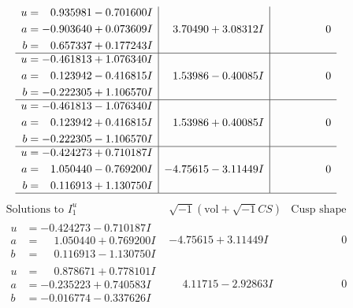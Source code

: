 \documentclass[1p]{elsarticle_modified}
\theoremstyle{definition}
\newcommand{\I}{\sqrt{-1}}
\begin{document}
$$\begin{array}{c|c|c}
\begin{aligned}
u &= \phantom{-}0.935981 - 0.701600 I \\
a &= -0.903640 + 0.073609 I \\
b &= \phantom{-}0.657337 + 0.177243 I\end{aligned}
 & \phantom{-}3.70490 + 3.08312 I & \phantom{-0.000000 } 0 \\ \hline\begin{aligned}
u &= -0.461813 + 1.076340 I \\
a &= \phantom{-}0.123942 - 0.416815 I \\
b &= -0.222305 + 1.106570 I\end{aligned}
 & \phantom{-}1.53986 - 0.40085 I & \phantom{-0.000000 } 0 \\ \hline\begin{aligned}
u &= -0.461813 - 1.076340 I \\
a &= \phantom{-}0.123942 + 0.416815 I \\
b &= -0.222305 - 1.106570 I\end{aligned}
 & \phantom{-}1.53986 + 0.40085 I & \phantom{-0.000000 } 0 \\ \hline\begin{aligned}
u &= -0.424273 + 0.710187 I \\
a &= \phantom{-}1.050440 - 0.769200 I \\
b &= \phantom{-}0.116913 + 1.130750 I\end{aligned}
 & -4.75615 - 3.11449 I & \phantom{-0.000000 } 0\\
 \hline 
 \end{array}$$\newpage$$\begin{array}{c|c|c}  
\text{Solutions to }I^u_{1}& \I (\text{vol} + \sqrt{-1}CS) & \text{Cusp shape}\\
 \hline 
\begin{aligned}
u &= -0.424273 - 0.710187 I \\
a &= \phantom{-}1.050440 + 0.769200 I \\
b &= \phantom{-}0.116913 - 1.130750 I\end{aligned}
 & -4.75615 + 3.11449 I & \phantom{-0.000000 } 0 \\ \hline\begin{aligned}
u &= \phantom{-}0.878671 + 0.778101 I \\
a &= -0.235223 + 0.740583 I \\
b &= -0.016774 - 0.337626 I\end{aligned}
 & \phantom{-}4.11715 - 2.92863 I & \phantom{-0.000000 } 0 \\ \hline\begin{aligned}

\end{aligned}
\end{array}$$
\end{document}
